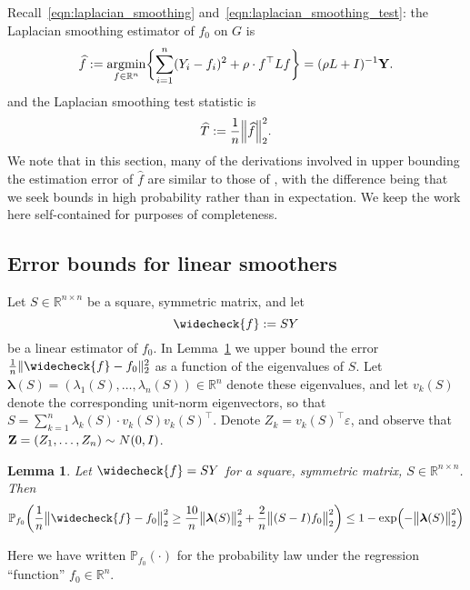 \documentclass[twoside]{article}
\newcommand{\Reals}{\mathbb{R}}
\newcommand{\1}{\mathbf{1}}
\DeclareMathOperator*{\argmin}{argmin}
\newcommand{\lambdavec}{\boldsymbol{\lambda}}
\newcommand{\Lap}{L}
\newcommand{\Id}{I}
\newcommand{\Pbb}{\mathbb{P}}
\newcommand{\wh}[1]{\widehat{#1}}
\newcommand{\wc}[1]{\widecheck{#1}}
\newtheorem{lemma}{Lemma}
\theoremstyle{definition}
\theoremstyle{remark}
\begin{document}
Recall~\eqref{eqn:laplacian_smoothing} and~\eqref{eqn:laplacian_smoothing_test}: the Laplacian smoothing estimator of $f_0$ on $G$ is
\begin{equation*}
\label{eqn:ls_G}
\wh{f} := \argmin_{f \in \Reals^n} \biggl\{ \sum_{i = 1}^{n}(Y_i - f_i)^2 + \rho \cdot f^{\top} \Lap f \biggr\} = (\rho \Lap + \Id)^{-1}{\bf Y}.
\end{equation*}
and the Laplacian smoothing test statistic is 
\begin{equation*}
\label{eqn:ls_ts_G}
\wh{T} := \frac{1}{n} \Bigl\|\wh{f}\Bigr\|_2^2.
\end{equation*}
We note that in this section, many of the derivations involved in upper bounding the estimation error of $\wh{f}$ are similar to those of \cite{sadhanala16}, with the difference being that we seek bounds in high probability rather than in expectation. We keep the work here self-contained for purposes of completeness.

\subsection{Error bounds for linear smoothers}
Let $S \in \Reals^{n \times n}$ be a square, symmetric matrix, and let 
\begin{equation*}
\wc{f} := SY
\end{equation*}
be a linear estimator of $f_0$. In  Lemma~\ref{lem:linear_smoother_fixed_graph_estimation} we upper bound the error $\frac{1}{n}\|\wc{f} - f_0\|_2^2$ as a function of the eigenvalues of $S$. Let $\lambdavec(S) = (\lambda_1(S),\ldots,\lambda_n(S)) \in \Reals^n$ denote these eigenvalues, and let $v_k(S)$ denote the corresponding unit-norm eigenvectors, so that $S = \sum_{k = 1}^{n} \lambda_k(S) \cdot v_k(S) v_k(S)^{\top}$. Denote $Z_k = v_k(S)^{\top} \varepsilon$, and observe that ${\bf Z} = (Z_1,\ldots,Z_n) \sim N(0,\Id)$. 

\begin{lemma}
	\label{lem:linear_smoother_fixed_graph_estimation}
	Let $\wc{f} = SY$ for a square, symmetric matrix, $S \in \Reals^{n \times n}$. Then
	\begin{equation*}
	\Pbb_{f_0}\biggl(\frac{1}{n}\bigl\|\wc{f} - f_0\bigr\|_2^2 \geq \frac{10}{n} \bigl\|\lambdavec(S)\bigr\|_2^2 + \frac{2}{n}\bigl\|(S - I)f_0\bigr\|_2^2\biggr) \leq 1 - \exp\Bigl(-\bigl\|\lambdavec(S)\bigr\|_2^2\Bigr)
	\end{equation*}
\end{lemma}
Here we have written $\Pbb_{f_0}(\cdot)$ for the probability law under the regression ``function'' $f_0 \in \Reals^n$. 
\end{document}
